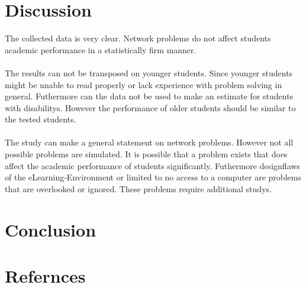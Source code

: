 \documentclass[runningheads]{llncs}
\begin{document}
\section{Discussion}
The collected data is very clear. Network problems do not affect students academic performance
in a statistically firm manner.\\\\

The results can not be transposed on younger students.
Since younger students might be unable to read properly or lack experience with problem solving
in general. Futhermore can the data not be used to make an estimate for students with disabilitys.
However the performance of older students should be similar to the tested students.\\\\

The study can make a general statement on network problems. However not all possible
problems are simulated. It is possible that a problem exists that does affect the academic performance of
students significantly. Futhermore designflaws of the eLearning-Environment
or limited to no access to a computer are problems that are overlooked or ignored. These problems
require additional studys.
\section{Conclusion}

\section{Refernces}
\end{document}
